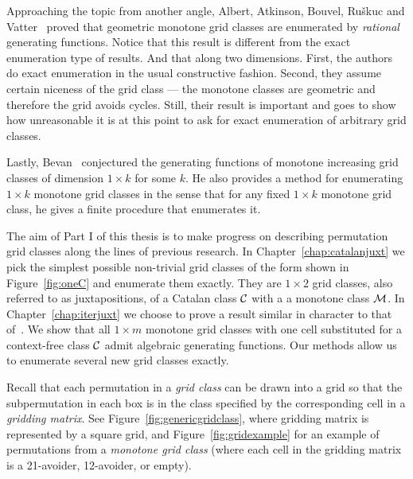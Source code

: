 \documentclass[12pt, a4paper, twoside]{report}
\begin{document}
Approaching the topic from another angle, Albert, Atkinson, Bouvel, Ru\v{s}kuc and Vatter~\cite{aabrv2013} proved that geometric monotone grid classes are enumerated by \emph{rational} generating functions. Notice that this result is different from the exact enumeration type of results. And that along two dimensions. First, the authors do exact enumeration in the usual constructive fashion. Second, they assume certain niceness of the grid class --- the monotone classes are geometric and therefore the grid avoids cycles. Still, their result is important and goes to show how unreasonable it is at this point to ask for exact enumeration of arbitrary grid classes.

Lastly, Bevan~\cite{bevan2015thesis} conjectured the generating functions of monotone increasing grid classes of dimension $1\times k$ for some $k$. He also provides a method for enumerating $1\times k$ monotone grid classes in the sense that for any fixed $1\times k$ monotone grid class, he gives a finite procedure that enumerates it.

The aim of Part I of this thesis is to make progress on describing permutation grid classes along the lines of previous research. In Chapter~\ref{chap:catalanjuxt} we pick the simplest possible non-trivial grid classes of the form shown in Figure~\ref{fig:oneC} and enumerate them exactly. They are $1\times 2$ grid classes, also referred to as juxtapositions, of a Catalan class $\mathcal{C}$ with a a monotone class $\mathcal{M}$. In Chapter~\ref{chap:iterjuxt} we choose to prove a result similar in character to that of~\cite{aabrv2013}. We show that all $1\times m$ monotone grid classes with one cell substituted for a context-free class $\mathcal{C}$ admit algebraic generating functions. Our methods allow us to enumerate several new grid classes exactly.

Recall that each permutation in a \emph{grid class} can be drawn into a grid so that the subpermutation in each box is in the class specified by the corresponding cell in a \emph{gridding matrix}. See Figure~\ref{fig:genericgridclass}, where gridding matrix is represented by a square grid, and Figure~\ref{fig:gridexample}  for an example of permutations from a \emph{monotone grid class} (where each cell in the gridding matrix is a 21-avoider, 12-avoider, or empty).

\newsavebox{\smlmata}
\newsavebox{\smlmatb}
\end{document}
